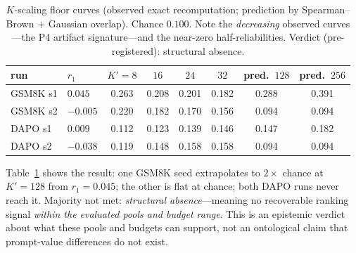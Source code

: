 \documentclass[11pt]{article}
\begin{document}
\begin{table}[t]
\centering
\caption{$K$-scaling floor curves (observed exact recomputation; prediction by
Spearman--Brown + Gaussian overlap). Chance $0.100$. Note the
\emph{decreasing} observed curves---the P4 artifact signature---and the
near-zero half-reliabilities. Verdict (pre-registered): structural absence.}
\label{tab:kcurve}
\begin{tabular}{llcccccc}
\toprule
run & $r_1$ & $K'{=}8$ & $16$ & $24$ & $32$ & pred.\ $128$ & pred.\ $256$\\
\midrule
GSM8K s1 & $0.045$ & 0.263 & 0.208 & 0.201 & 0.182 & 0.288 & 0.391\\
GSM8K s2 & $-0.005$ & 0.220 & 0.182 & 0.170 & 0.156 & 0.094 & 0.094\\
DAPO s1 & $0.009$ & 0.112 & 0.123 & 0.139 & 0.146 & 0.147 & 0.182\\
DAPO s2 & $-0.038$ & 0.119 & 0.148 & 0.158 & 0.158 & 0.094 & 0.094\\
\bottomrule
\end{tabular}
\end{table}

Table~\ref{tab:kcurve} shows the result: one GSM8K seed extrapolates to
$2\times$ chance at $K'{=}128$ from $r_1{=}0.045$; the other is flat at
chance; both DAPO runs never reach it. Majority not met: \emph{structural
absence}---meaning no recoverable ranking signal \emph{within the evaluated
pools and budget range}. This is an epistemic verdict about what these pools
and budgets can support, not an ontological claim that prompt-value
differences do not exist.
\end{document}
